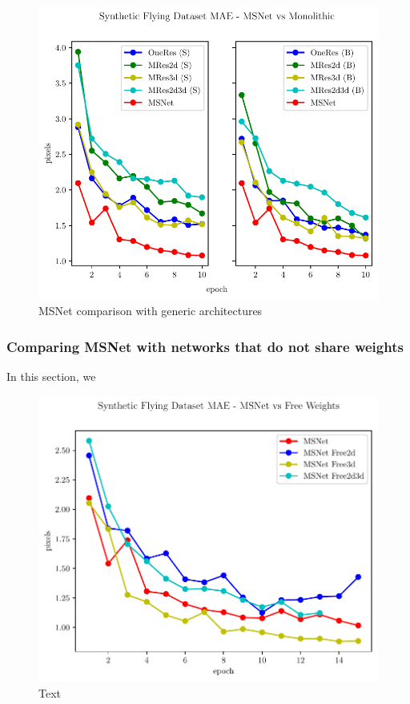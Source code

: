 \documentclass[10pt]{article}
\begin{document}
\begin{figure}[h]
    \centering
    \includegraphics[width=\textwidth]{paper/latex/figures/freiburg_msnet_vs_monolithic_mae.pdf}
    \caption{MSNet comparison with generic architectures}
    \label{fig:mae_SFNvsGenericNets}
\end{figure}

\subsubsection{Comparing MSNet with networks that do not share weights}

In this section, we 

\begin{figure}[t]
    \centering
    \includegraphics[width=\textwidth]{paper/latex/figures/freiburg_msnet_vs_free_weights_mae.pdf}
    \caption{Text}
    \label{fig:mae_SFNvsSFN_free_weights}
\end{figure}
\end{document}
